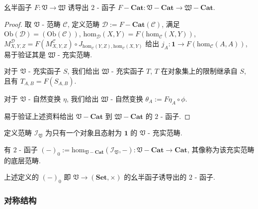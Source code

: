 \begin{lemma}
    幺半函子 \(F : \mathfrak{V} \to \mathfrak{W}\) 诱导出 \(2\) - 函子 \(F - \mathbf{Cat} : \mathfrak{V} - \mathbf{Cat} \to \mathfrak{W} - \mathbf{Cat}\).

    \begin{proof}
        取 \(\mathfrak{V}\) - 范畴 \(\mathcal{C}\), 定义范畴 \(\mathcal{D} := {F - \mathbf{Cat}} (\mathcal{C})\),
        满足 \(\mathrm{Ob} (\mathcal{D}) = (\mathrm{Ob} (\mathcal{C}))\), \(\mathrm{hom}_{\mathcal{D}} (X,Y) = F(\mathrm{hom}_{\mathcal{C}} (X,Y))\),
        \(M^{\mathcal{D}}_{X,Y,Z} = F(M^{\mathcal{C}}_{X,Y,Z}) \circ J_{\mathrm{hom}_\mathcal{C} (Y,Z),\mathrm{hom}_\mathcal{C} (X,Y)}\)
        给出 \(j_A : \mathbf{1} \to F (\mathrm{hom}_{\mathcal{C}} (A,A))\), 易于验证其是 \(\mathfrak{W}\) - 充实范畴.

        对于 \(\mathfrak{V}\) - 充实函子 \(S\), 我们给出 \(\mathfrak{W}\) - 充实函子 \(T\), \(T\) 在对象集上的限制继承自 \(S\),
        且有 \(T_{A,B} = F(S_{A,B})\).

        对于 \(\mathfrak{V}\) - 自然变换 \(\eta\), 我们给出 \(\mathfrak{W}\) - 自然变换 \(\theta_A := F \eta_A \circ \phi\).

        易于验证上述资料给出 \(\mathfrak{V} - \mathbf{Cat}\) 到 \(\mathfrak{W} - \mathbf{Cat}\) 的 \(2\) - 函子.
    \end{proof}
\end{lemma}

\begin{definition}
    定义范畴 \(\mathcal{I}_{\mathfrak{V}}\) 为只有一个对象且态射为 \(\mathbf{1}\) 的 \(\mathfrak{V}\) - 充实范畴.
\end{definition}

\begin{definition}
    有 \(2\) - 函子 \((-)_0 := \mathrm{hom}_{\mathfrak{V} - \mathbf{Cat}} (\mathcal{I}_{\mathfrak{V}}, -):\mathfrak{V} - \mathbf{Cat} \to \mathbf{Cat}\),
    其像称为该充实范畴的底层范畴.
\end{definition}

\begin{lemma}
    上述定义的 \({(-)}_0\) 即 \(\mathfrak{V} \to (\mathbf{Set}, \times)\) 的幺半函子诱导出的 \(2\) - 函子.
\end{lemma}

\subsubsection{对称结构}

